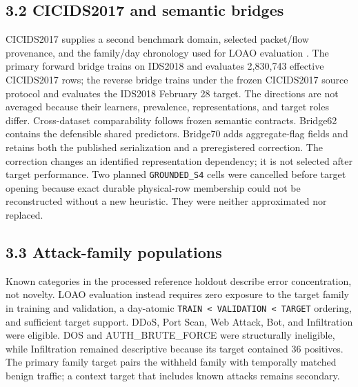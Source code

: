 \documentclass[preprint,12pt]{elsarticle}
\begin{document}
\subsection{3.2 CICIDS2017 and semantic bridges}
CICIDS2017 supplies a second benchmark domain, selected packet/flow provenance, and the family/day chronology used for LOAO evaluation \cite{cicids2017_official, sharafaldin2018toward}. The primary forward bridge trains on IDS2018 and evaluates 2,830,743 effective CICIDS2017 rows; the reverse bridge trains under the frozen CICIDS2017 source protocol and evaluates the IDS2018 February 28 target. The directions are not averaged because their learners, prevalence, representations, and target roles differ.
Cross-dataset comparability follows frozen semantic contracts. Bridge62 contains the defensible shared predictors. Bridge70 adds aggregate-flag fields and retains both the published serialization and a preregistered correction. The correction changes an identified representation dependency; it is not selected after target performance. Two planned \texttt{GROUNDED\_S4} cells were cancelled before target opening because exact durable physical-row membership could not be reconstructed without a new heuristic. They were neither approximated nor replaced.

\subsection{3.3 Attack-family populations}
Known categories in the processed reference holdout describe error concentration, not novelty. LOAO evaluation instead requires zero exposure to the target family in training and validation, a day-atomic \texttt{TRAIN < VALIDATION < TARGET} ordering, and sufficient target support. DDoS, Port Scan, Web Attack, Bot, and Infiltration were eligible. DOS and AUTH\_BRUTE\_FORCE were structurally ineligible, while Infiltration remained descriptive because its target contained 36 positives. The primary family target pairs the withheld family with temporally matched benign traffic; a context target that includes known attacks remains secondary.
\end{document}
